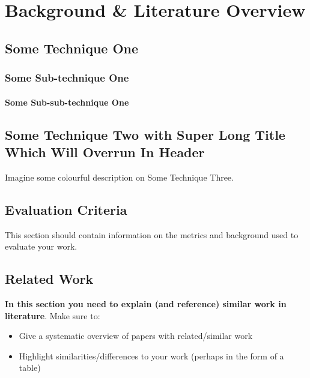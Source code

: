 \chapter{Background \& Literature Overview}



\section{Some Technique One}
\blindtext
\subsection{Some Sub-technique One}
\blindtext
{}
\blindtext
\subsubsection{Some Sub-sub-technique One}
\blindtext
{}
\blindtext
{}

\section[Some Technique Two]{Some Technique Two with Super Long Title Which Will Overrun In Header}
\blindtext[5]

Imagine some colourful description on Some Technique Three.


\section{Evaluation Criteria}
This section should contain information on the metrics and background used to evaluate your work.

\section{Related Work}
\textbf{In this section you need to explain (and reference) similar work in literature}.  Make sure to:

\begin{itemize}
 \item Give a systematic overview of papers with related/similar work
 \item Highlight similarities/differences to your work (perhaps in the form of a table)
\end{itemize}

